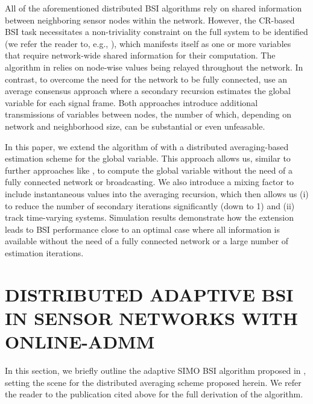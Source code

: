 \documentclass{article}
\begin{document}
All of the aforementioned distributed BSI algorithms rely on shared information between neighboring sensor nodes within the network.
However, the CR-based BSI task necessitates a non-triviality constraint on the full system to be identified (we refer the reader to, e.g., \cite{huangAdaptiveMultichannelLeast2002,huangClassFrequencydomainAdaptive2003}), which manifests itself as one or more variables that require network-wide shared information for their computation.
The algorithm in \cite{blochbergerDBSI} relies on node-wise values being relayed throughout the network.
In contrast, to overcome the need for the network to be fully connected, \cite{yuDistributedBlindSystem2014, liuDistributedBlindIdentification2016} use an average consensus \cite{xiaoFastLinearIterations2004} approach where a secondary recursion estimates the global variable for each signal frame.
Both approaches introduce additional transmissions of variables between nodes, the number of which, depending on network and neighborhood size, can be substantial or even unfeasable.

In this paper, we extend the algorithm of \cite{blochbergerDBSI} with a distributed averaging-based \cite{xiaoFastLinearIterations2004} estimation scheme for the global variable.
This approach allows us, similar to further approaches like \cite{6334305,9914798}, to compute the global variable without the need of a fully connected network or broadcasting.
We also introduce a mixing factor to include instantaneous values into the averaging recursion, which then allows us (i) to reduce the number of secondary iterations significantly (down to 1) and (ii) track time-varying systems.
Simulation results demonstrate how the extension leads to BSI performance close to an optimal case where all information is available without the need of a fully connected network or a large number of estimation iterations.

\section{DISTRIBUTED ADAPTIVE BSI IN SENSOR NETWORKS WITH ONLINE-ADMM}
\label{sec:dbsi}
In this section, we briefly outline the adaptive SIMO BSI algorithm proposed in \cite{blochbergerDBSI}, setting the scene for the distributed averaging scheme proposed herein.
We refer the reader to the publication cited above for the full derivation of the algorithm.
\end{document}
